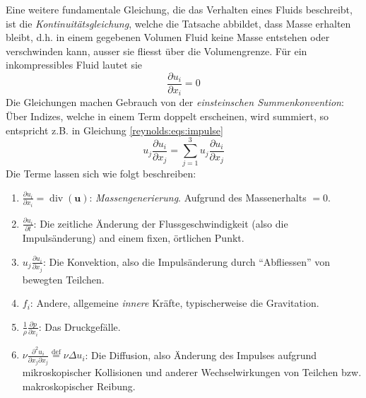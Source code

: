 Eine weitere fundamentale Gleichung, die das Verhalten eines Fluids beschreibt, ist die \emph{Kontinuitätsgleichung},
welche die Tatsache abbildet, dass Masse erhalten bleibt, d.h. in einem gegebenen Volumen Fluid keine Masse
entstehen oder verschwinden kann, ausser sie fliesst über die Volumengrenze. Für ein inkompressibles Fluid lautet sie
%
\begin{equation}
    \label{reynolds:eqs:mass}
    \frac{\partial u_i}{\partial x_i} = 0
\end{equation}
%
Die Gleichungen machen Gebrauch von der \emph{einsteinschen Summenkonvention}: Über Indizes, welche in einem Term doppelt
erscheinen, wird summiert, so entspricht z.B. in Gleichung \eqref{reynolds:eqs:impulse}
%
\begin{equation}
u_j \frac{\partial u_i}{\partial x_j} = \sum_{j=1}^{3} u_j \frac{\partial u_i}{\partial x_j}
\end{equation}
%
Die Terme lassen sich wie folgt beschreiben:
%
\begin{enumerate}
    \item $\frac{\partial u_i}{\partial x_i} = \operatorname{div}(\mathbf{u})$: \emph{Massengenerierung}.
    Aufgrund des Massenerhalts $ = 0$.
    \item $\frac{\partial u_i}{\partial t}$: Die zeitliche Änderung der Flussgeschwindigkeit (also die 
        Impulsänderung) and einem fixen, örtlichen Punkt.
    \item $u_j \frac{\partial u_i}{\partial x_j}$: Die Konvektion, also die Impulsänderung durch ``Abfliessen''
        von bewegten Teilchen.
    \item $f_i$: Andere, allgemeine \emph{innere} Kräfte, typischerweise die Gravitation.
    \item $\frac{1}{\rho} \frac{\partial p}{\partial x_i}$: Das Druckgefälle.
    \item $\nu \frac{\partial^2 u_i}{\partial x_j \partial x_j} \overset{\text{def}}{=} \nu \Delta u_i$: Die Diffusion, also Änderung des Impulses
        aufgrund mikroskopischer Kollisionen und anderer Wechselwirkungen von Teilchen bzw.
        makroskopischer Reibung.
\end{enumerate}
%
